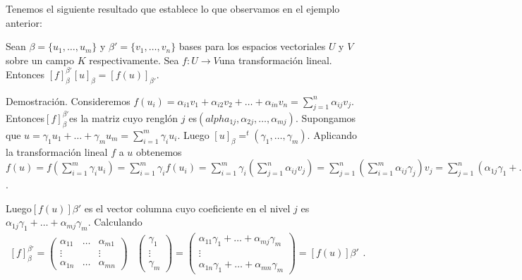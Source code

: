    	 	Tenemos el siguiente resultado que establece lo que observamos en el ejemplo
   	 	anterior:
   	 	\begin{pro} \label{pro:propocicion1.11}
   	 		Sean $\beta = \{u_{1}, \ldots , u_{m} \}$ y $ \beta ' = \{v_{1}, \ldots , v_{n}\} $ bases para los espacios vectoriales $ U $ y $  V  $sobre un campo $ K $ respectivamente. Sea $ f:U \rightarrow V  $una transformación lineal. Entonces $ [f ]_{\beta}^{\beta ' }
   	 		[u]_{\beta} = [f (u)]_{\beta '}  $.
   	 	\end{pro}
    	\begin{demo}
    		\normalfont Demostración. Consideremos $ f(u_{i}) = \alpha_{i1}v_{1} + \alpha_{i2} v_{2} + \ldots + \alpha_{in} v_{n} = \sum_{j=1}^{n} \alpha_{ij} v_{j}$. Entonces$  [f ]_{\beta}^{\beta ' }  $es la matriz cuyo renglón $ j $ es$  (alpha_{1j} , \alpha_{2j} , \ldots, \alpha_{mj} ) $. Supongamos que $ u = \gamma_{1}u_{1} + \ldots + \gamma_{m} u_{m} =
    	 \sum_{i=1}^{m}\gamma_{i} u_{i} $.
    		Luego $ [u]_{\beta} = ^{t}(\gamma_{1}, \ldots, \gamma_{m}) $. Aplicando la transformación lineal $ f $ a $ u $ obtenemos $ f(u) = f(\sum_{i=1}^{m} \gamma_{i} u_{i}) = \sum_{i=1}^{m} \gamma_{i} f(u_{i}) = \sum_{i=1}^{m} \gamma_{i}(\sum_{j=1}^{n} \alpha_{ij} v_{j}) = \sum_{j=1}^{n} (\sum_{i=1}^{m} \alpha_{ij} \gamma_{j})v_{j} = \sum_{j=1}^{n}(\alpha_{1j}\gamma_{1}+\ldots+\alpha_{mj}\gamma_{m})v_{j}$.    		
    	\end{demo}
    	Luego$  [f (u)]\beta ' $ es el vector columna cuyo coeficiente en el nivel $ j $ es $\alpha_{1j}\gamma_{1}+\ldots+\alpha_{mj}\gamma_{m} $. Calculando
    	\[ \begin{array}{cc}
    		  [f ]_{\beta}^{\beta ' } = \left( \begin{array}{ccc}
    		  	\alpha_{11} & \ldots & \alpha_{m1} \\
    		  	\vdots &   &  \vdots \\
    		  	\alpha_{1n} & \ldots & \alpha_{mn}
    		  \end{array} \right) & \left( \begin{array}{c} \gamma_{1} \\ \vdots \\ \gamma_{m} \end{array} \right) = \left( \begin{array}{c}
    		  \alpha_{11}\gamma_{1}+\ldots+\alpha_{mj}\gamma_{m} \\ \vdots \\ \alpha_{1n}\gamma_{1}+\ldots+\alpha_{mn}\gamma_{m}
    		  \end{array} \right) = [f(u)]\beta '
    	\end{array}. \]
